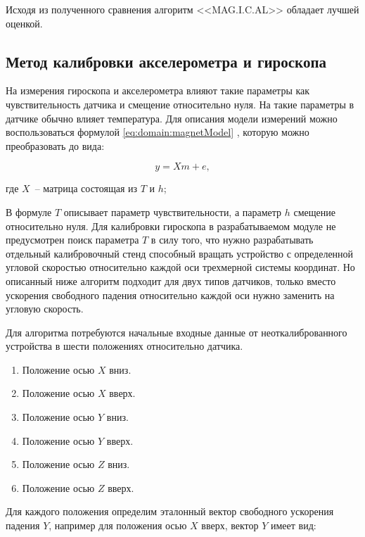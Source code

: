 Исходя из полученного сравнения алгоритм <<MAG.I.C.AL>> обладает лучшей оценкой.

\subsection{Метод калибровки акселерометра и гироскопа}

На измерения гироскопа и акселерометра влияют такие параметры как чувствительность датчика и смещение относительно нуля.
На такие параметры в датчике обычно влияет температура.
Для описания модели измерений можно воспользоваться формулой \ref{eq:domain:magnetModel}
, которую можно преобразовать до вида:

\begin{equation}
    \label{eq:domain:magnetModel}
    y = Xm+e,
  \end{equation}
  \begin{explanationx}
    \item[где] $X$~-- матрица состоящая из $T$ и $h$;
  \end{explanationx}

В формуле $T$ описывает параметр чувствительности, а параметр $h$ смещение относительно нуля.
Для калибровки гироскопа в разрабатываемом модуле не предусмотрен поиск параметра $T$ в силу того, 
что нужно разрабатывать отдельный калибровочный стенд способный вращать устройство с определенной 
угловой скоростью относительно каждой оси трехмерной системы координат. Но описанный ниже алгоритм подходит для двух типов датчиков, 
только вместо ускорения свободного падения относительно каждой оси нужно заменить на угловую скорость.

Для алгоритма потребуются начальные входные данные от неоткалиброванного устройства в шести положениях относительно датчика.
\begin{enumerate}
    \item Положение осью $X$ вниз.
    \item Положение осью $X$ вверх.
    \item Положение осью $Y$ вниз.
    \item Положение осью $Y$ вверх.
    \item Положение осью $Z$ вниз.
    \item Положение осью $Z$ вверх.
\end{enumerate}

Для каждого положения определим эталонный вектор свободного ускорения падения $Y$, например для положения осью $X$ вверх, вектор $Y$ имеет вид:

